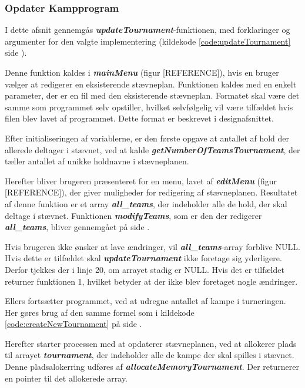 \subsubsection{Opdater Kampprogram}
I dette afsnit gennemgås \textbf{\textit{updateTournament}}-funktionen, med forklaringer og argumenter for den valgte implementering (kildekode \ref{code:updateTournament} side \pageref{code:updateTournament}).
\par
Denne funktion kaldes i \textbf{\textit{mainMenu}} (figur [REFERENCE]), hvis en bruger vælger at redigerer en eksisterende stævneplan. Funktionen kaldes med en enkelt parameter, der er en fil med den eksisterende stævneplan. Formatet skal være det samme som programmet selv opstiller, hvilket selvfølgelig vil være tilfældet hvis filen blev lavet af programmet. Dette format er beskrevet i designafsnittet.
\par
Efter initialiseringen af variablerne, er den første opgave at antallet af hold der allerede deltager i stævnet, ved at kalde \textbf{\textit{getNumberOfTeamsTournament}}, der tæller antallet af unikke holdnavne i stævneplanen. 
\par
Herefter bliver brugeren præsenteret for en menu, lavet af \textbf{\textit{editMenu}} (figur [REFERENCE]), der giver muligheder for redigering af stævneplanen. Resultatet af denne funktion er et array \textbf{\textit{all\_teams}}, der indeholder alle de hold, der skal deltage i stævnet. Funktionen \textbf{\textit{modifyTeams}}, som er den der redigerer \textbf{\textit{all\_teams}}, bliver gennemgået på side \pageref{modifyTeamsAfsnit}.
\par
Hvis brugeren ikke ønsker at lave ændringer, vil \textbf{\textit{all\_teams}}-array forblive NULL. Hvis dette er tilfældet skal \textbf{\textit{updateTournament}} ikke foretage sig yderligere. Derfor tjekkes der i linje 20, om arrayet stadig er NULL. Hvis det er tilfældet returner funktionen 1, hvilket betyder at der ikke blev foretaget nogle ændringer.
\par
Ellers fortsætter programmet, ved at udregne antallet af kampe i turneringen. Her gøres brug af den samme formel som i kildekode \ref{code:createNewTournament} på side \pageref{code:createNewTournament}.
\par
Herefter starter processen med at opdaterer stævneplanen, ved at allokerer plads til arrayet \textbf{\textit{tournament}}, der indeholder alle de kampe der skal spilles i stævnet.
Denne pladsalokerring udføres af \textbf{\textit{allocateMemoryTournament}}. Der returnerer en pointer til det allokerede array.
